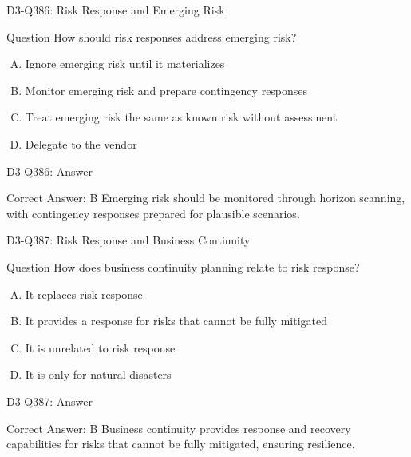 \documentclass{beamer}
\begin{document}
\begin{frame}{D3-Q386: Risk Response and Emerging Risk}
	\begin{block}{Question}
		How should risk responses address emerging risk?
	\end{block}
	\begin{enumerate}[(A)]
		\item Ignore emerging risk until it materializes
		\item Monitor emerging risk and prepare contingency responses
		\item Treat emerging risk the same as known risk without assessment
		\item Delegate to the vendor
	\end{enumerate}
\end{frame}
\begin{frame}{D3-Q386: Answer}
	\begin{block}{Correct Answer: B}
		Emerging risk should be monitored through horizon scanning, with contingency responses prepared for plausible scenarios.
	\end{block}
\end{frame}

\begin{frame}{D3-Q387: Risk Response and Business Continuity}
	\begin{block}{Question}
		How does business continuity planning relate to risk response?
	\end{block}
	\begin{enumerate}[(A)]
		\item It replaces risk response
		\item It provides a response for risks that cannot be fully mitigated
		\item It is unrelated to risk response
		\item It is only for natural disasters
	\end{enumerate}
\end{frame}
\begin{frame}{D3-Q387: Answer}
	\begin{block}{Correct Answer: B}
		Business continuity provides response and recovery capabilities for risks that cannot be fully mitigated, ensuring resilience.
	\end{block}
\end{frame}
\end{document}
